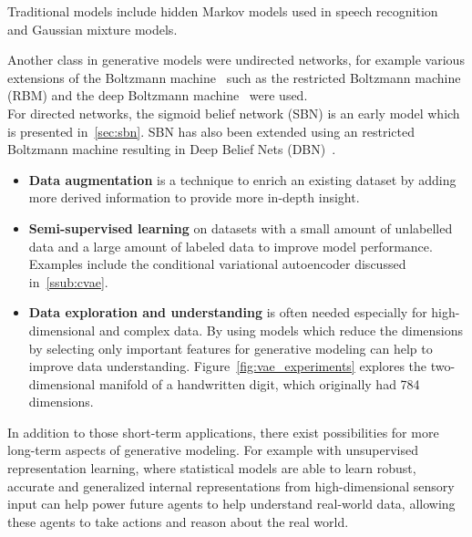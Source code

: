 \newpage

Traditional models include hidden Markov models used in speech recognition~\cite{hmm:1989} and Gaussian mixture models.

Another class in generative models were undirected networks, for example various extensions of the Boltzmann machine~\cite{bm:1985} such as the restricted Boltzmann machine (RBM) and the deep Boltzmann machine~\cite{dbm:2009} were used.\\

For directed networks, the sigmoid belief network (SBN) is an early model which is presented in~\ref{sec:sbn}.
SBN has also been extended using an restricted Boltzmann machine resulting in Deep Belief Nets (DBN)~\cite{learning_dbn:2006}.




\begin{itemize}
  \item \textbf{Data augmentation} is a technique to enrich an existing dataset by adding more derived information to provide more in-depth insight.
  \item \textbf{Semi-supervised learning} on datasets with a small amount of unlabelled data and a large amount of labeled data to improve model performance. Examples include the conditional variational autoencoder discussed in~\ref{ssub:cvae}.
  \item \textbf{Data exploration and understanding} is often needed especially for high-dimensional and complex data. By using models which reduce the dimensions by selecting only important features for generative modeling can help to improve data understanding. Figure~\ref{fig:vae_experiments} explores the two-dimensional manifold of a handwritten digit, which originally had 784 dimensions.
\end{itemize}

In addition to those short-term applications, there exist possibilities for more long-term aspects of generative modeling.
For example with unsupervised representation learning, where statistical models are able to learn robust, accurate and generalized internal representations from high-dimensional sensory input can help power future agents to help understand real-world data, allowing these agents to take actions and reason about the real world.

